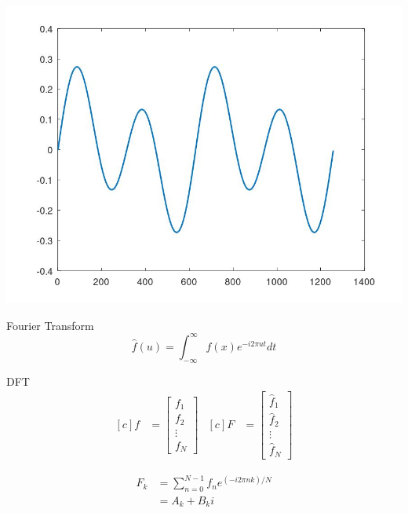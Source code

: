 \documentclass[presentation]{beamer}
\begin{document}
\begin{center}
\includegraphics[scale=0.1]{./p3.jpg}
\end{center}

\begin{frame}[label={sec:org3ad615b}]{Fourier Transform}
\[ \hat{f}(u) = \int_{-\infty}^{\infty} f(x)e^{-i2 \pi ut}dt \]
\end{frame}

\begin{frame}[label={sec:org10a2c79}]{DFT}
\begin{equation*}
\begin{aligned}[c]
f &=
  \begin{bmatrix}
    f_{1} \\
    f_{2} \\
    \vdots \\
    f_{N}
    \end{bmatrix}
\end{aligned}
\begin{aligned}[c]
F &=
  \begin{bmatrix}
    \hat{f}_{1} \\
    \hat{f}_{2} \\
    \vdots \\
    \hat{f}_{N}
    \end{bmatrix}
\end{aligned}
\end{equation*}

\begin{align*}
F_{k} &= \sum_{n=0}^{N-1} f_{n} e^{(-i2 \pi nk)/N} \\
      &= A_{k} + B_{k}i
\end{align*}
\end{frame}
\end{document}
